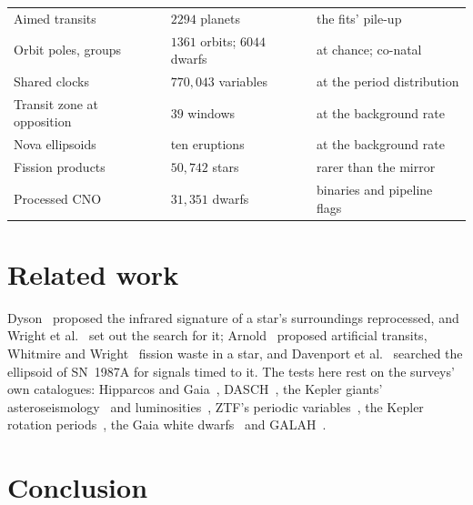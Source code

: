\documentclass[3p,11pt]{elsarticle}
\begin{document}
\begin{table}[t]
\begin{tabular}{>{\raggedright\arraybackslash}p{} >{\raggedright\arraybackslash}p{} >{\raggedright\arraybackslash}p{}}
Aimed transits & $2294$ planets & the fits' pile-up \\
Orbit poles, groups & $1361$ orbits; $6044$ dwarfs & at chance; co-natal \\
Shared clocks & $770{,}043$ variables & at the period distribution \\
Transit zone at opposition & $39$ windows & at the background rate \\
Nova ellipsoids & ten eruptions & at the background rate \\
Fission products & $50{,}742$ stars & rarer than the mirror \\
Processed CNO & $31{,}351$ dwarfs & binaries and pipeline flags \\
\bottomrule
\end{tabular}
\end{table}

\section{Related work}\label{sec:related}

Dyson~\cite{Dyson1960} proposed the infrared signature of a star's surroundings
reprocessed, and Wright et al.~\cite{Wright2014} set out the search for it; Arnold~\cite{Arnold2005}
proposed artificial transits, Whitmire and Wright~\cite{WhitmireWright1980} fission waste in
a star, and Davenport et al.~\cite{Davenport2022,Cabrales2024} searched the ellipsoid of
SN~1987A for signals timed to it. The tests here rest on the surveys' own catalogues: Hipparcos and
Gaia~\cite{Perryman1997,Gaia2023nss}, DASCH~\cite{Tang2013}, the Kepler giants'
asteroseismology~\cite{Yu2018} and luminosities~\cite{Berger2020}, ZTF's periodic
variables~\cite{Chen2020}, the Kepler rotation periods~\cite{McQuillan2013,Mazeh2015}, the
Gaia white dwarfs~\cite{GentileFusillo2021,Bergeron2022} and GALAH~\cite{Buder2025}.

\section{Conclusion}\label{sec:conclusion}
\end{document}
